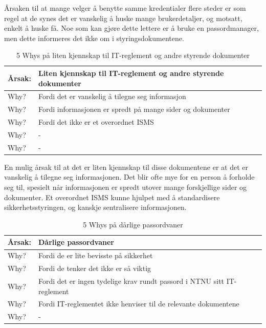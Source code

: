 Årsaken til at mange velger å benytte samme kredentialer flere steder er som regel at de synes det er vanskelig å huske mange brukerdetaljer, og motsatt, enkelt å huske få. Noe som kan gjøre dette lettere er å bruke en passordmanager, men dette informeres det ikke om i styringsdokumentene. 

\begin{table} [H]
    \centering
    \begin{tabular}{ | m{5em} | m{30em} | }
        \hline
            \cellcolor{yellow} Årsak: & \cellcolor{yellow} Liten kjennskap til IT-reglement og andre styrende dokumenter \\
        \hline
            Why? & Fordi det er vanskelig å tilegne seg informasjon \\
        \hline
            Why? & Fordi informasjonen er spredt på mange sider og dokumenter \\
        \hline
            Why? & Fordi det ikke er et overordnet ISMS \\
        \hline
            Why? & - \\
        \hline
            Why? & - \\
        \hline
    \end{tabular}
    \caption[5 Whys: Liten kjennskap til IT-reglement og andre styrende dokumenter]{5 Whys på liten kjennskap til IT-reglement og andre styrende dokumenter}
    \label{5Whys-phishing}
\end{table}

En mulig årsak til at det er liten kjennskap til disse dokumentene er at det er vanskelig å tilegne seg informasjonen. Det blir ofte mye for en person å forholde seg til, spesielt når informasjonen er spredt utover mange forskjellige sider og dokumenter. Et overordnet ISMS kunne hjulpet med å standardisere sikkerhetsstyringen, og kanskje sentralisere informasjonen. 

\begin{table} [H]
    \centering
    \begin{tabular}{ | m{5em} | m{30em} | }
        \hline
            \cellcolor{yellow} Årsak: & \cellcolor{yellow} Dårlige passordvaner \\
        \hline
            Why? & Fordi de er lite bevisste på sikkerhet \\
        \hline
            Why? & Fordi de tenker det ikke er så viktig \\
        \hline
            Why? & Fordi det er ingen tydelige krav rundt passord i NTNU sitt IT-reglement \\
        \hline
            Why? & Fordi IT-reglementet ikke henviser til de relevante dokumentene \\
        \hline
            Why? & - \\
        \hline
    \end{tabular}
    \caption[5 Whys: Dårlige passordvaner]{5 Whys på dårlige passordvaner}
    \label{5Whys-passordvaner}
\end{table}

